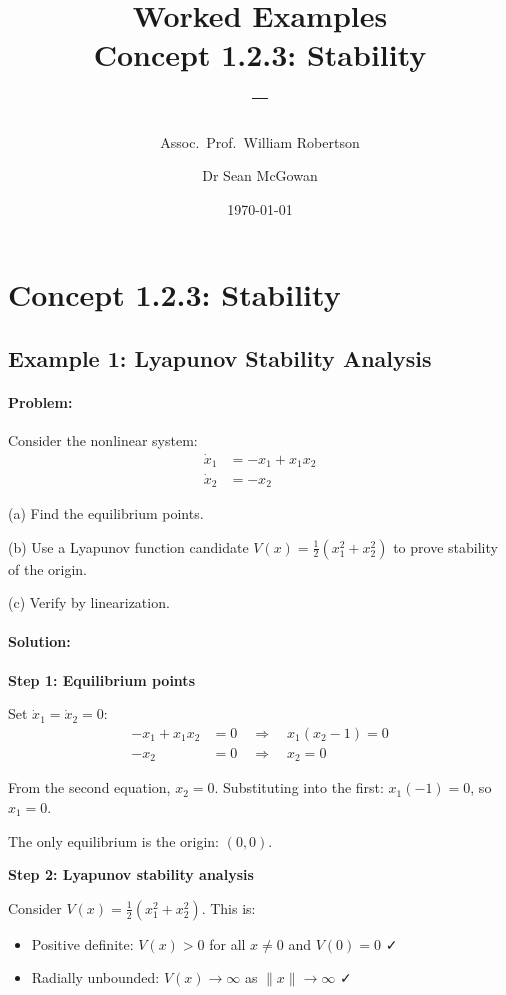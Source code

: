 \documentclass[11pt,a4paper]{article}
\title{\textbf{Worked Examples}\\[0.5em]
\large Concept 1.2.3: Stability\\[0.3em]
\normalsize \coursesubtitle{} -- \coursetitle}
\author{Assoc.\ Prof.\ William Robertson \and Dr Sean McGowan}
\date{\today}
\begin{document}
\maketitle
\tableofcontents
\newpage

\section{Concept 1.2.3: Stability}

\subsection{Example 1: Lyapunov Stability Analysis}

\paragraph{Problem:} Consider the nonlinear system:
\begin{align}
  \dot{x}_1 &= -x_1 + x_1 x_2 \\
  \dot{x}_2 &= -x_2
\end{align}

(a) Find the equilibrium points.

(b) Use a Lyapunov function candidate $V(x) = \frac{1}{2}(x_1^2 + x_2^2)$ to prove stability of the origin.

(c) Verify by linearization.

\paragraph{Solution:}

\textbf{Step 1: Equilibrium points}

Set $\dot{x}_1 = \dot{x}_2 = 0$:
\begin{align}
  -x_1 + x_1 x_2 &= 0 \quad \Rightarrow \quad x_1(x_2 - 1) = 0 \\
  -x_2 &= 0 \quad \Rightarrow \quad x_2 = 0
\end{align}

From the second equation, $x_2 = 0$. Substituting into the first: $x_1(-1) = 0$, so $x_1 = 0$.

The only equilibrium is the origin: $(0, 0)$.

\textbf{Step 2: Lyapunov stability analysis}

Consider $V(x) = \frac{1}{2}(x_1^2 + x_2^2)$. This is:
\begin{itemize}
  \item Positive definite: $V(x) > 0$ for all $x \neq 0$ and $V(0) = 0$ ✓
  \item Radially unbounded: $V(x) \to \infty$ as $\|x\| \to \infty$ ✓
\end{itemize}
\end{document}
